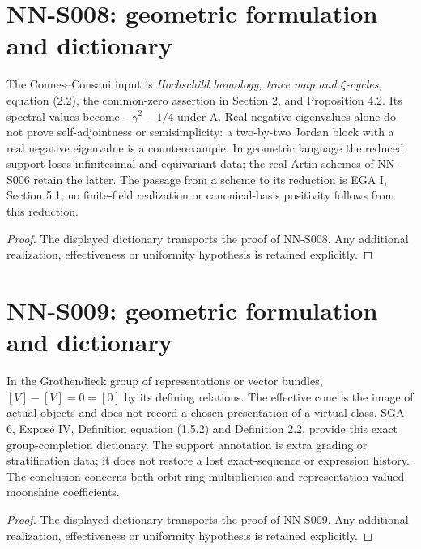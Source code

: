 \section{NN-S008: geometric formulation and dictionary}
\begin{geometricstatement}[NN-S008]
The Connes--Consani input is \emph{Hochschild homology, trace map
and $\zeta$-cycles}, equation (2.2), the common-zero assertion in
Section 2, and Proposition 4.2. Its spectral values become
$-\gamma^2-1/4$ under A. Real negative eigenvalues alone do not
prove self-adjointness or semisimplicity: a two-by-two Jordan
block with a real negative eigenvalue is a counterexample.
In geometric language the reduced support loses infinitesimal
and equivariant data; the real Artin schemes of NN-S006 retain
the latter. The passage from a scheme to its reduction is EGA I,
Section 5.1; no finite-field realization or canonical-basis
positivity follows from this reduction.
\end{geometricstatement}
\begin{proof} The displayed dictionary transports the proof of NN-S008. Any additional realization, effectiveness or uniformity hypothesis is retained explicitly.\end{proof}


\section{NN-S009: geometric formulation and dictionary}
\begin{geometricstatement}[NN-S009]
In the Grothendieck group of representations or vector bundles,
$[V]-[V]=0=[0]$ by its defining relations. The effective cone is
the image of actual objects and does not record a chosen
presentation of a virtual class. SGA 6, Expos\'e IV, Definition
equation (1.5.2) and Definition 2.2, provide this exact group-completion
dictionary. The support annotation is extra grading or
stratification data; it does not restore a lost exact-sequence
or expression history. The conclusion concerns both orbit-ring
multiplicities and representation-valued moonshine coefficients.
\end{geometricstatement}
\begin{proof} The displayed dictionary transports the proof of NN-S009. Any additional realization, effectiveness or uniformity hypothesis is retained explicitly.\end{proof}



